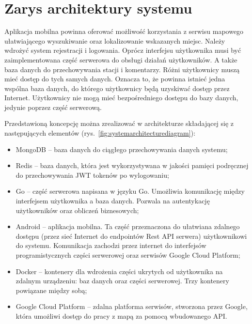 \section{Zarys architektury systemu}
Aplikacja mobilna powinna oferować możliwość korzystania z serwisu mapowego ułatwiającego wyszukiwanie oraz lokalizowanie wskazanych miejsc.
Należy wdrożyć system rejestracji i logowania. Oprócz interfejsu użytkownika musi być zaimplementowana część serwerowa do obsługi działań użytkowników. A także baza danych do przechowywania stacji i komentarzy.
Różni użytkownicy muszą mieć dostęp do tych samych danych. Oznacza to, że powinna istnieć jedna wspólna baza danych, do którego użytkownicy będą uzyskiwać dostęp przez Internet. Użytkownicy nie mogą mieć bezpośredniego dostępu do bazy danych, jedynie poprzez część serwerową.

Przedstawioną koncepcję można zrealizować w architekturze składającej się z następujących elementów (rys.~\ref{fig:systemarchitecturediagram}):
\begin{itemize}
    \item MongoDB -- baza danych do ciągłego przechowywania danych systemu;
    \item Redis -- baza danych, która jest wykorzystywana w jakości pamięci podręcznej do przechowywania JWT tokenów po wylogowaniu;
    \item Go -- część serwerowa napisana w języku Go. Umożliwia komunikację między interfejsem użytkownika a baza danych. Pozwala na autentykację użytkowników oraz obliczeń biznesowych;
    \item Android -- aplikacja mobilna. Ta część przeznaczona do ułatwiana zdalnego dostępu (przez sieć Internet do endpointów Rest API serwera) użytkownikowi do systemu. Komunikacja zachodzi przez internet do interfejsów programistycznych części serwerowej oraz serwisów Google Cloud Platform;
    \item Docker -- kontenery dla wdrożenia części ukrytych od użytkownika na zdalnym urządzeniu: baz danych oraz części serwerowej. Trzy kontenery powiązane między sobą;
    \item Google Cloud Platform -- zdalna platforma serwisów, stworzona przez Google, która umożliwi dostęp do pracy z mapą za pomocą wbudowanego API.
\end{itemize}

